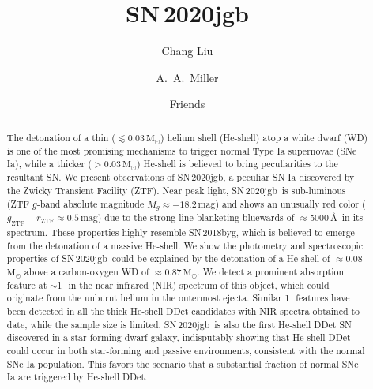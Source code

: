 \documentclass[twocolumn]{aastex631}
\newcommand{\sn}{SN\,2020jgb}
\begin{document}
\title{\sn}

\author[0000-0002-7866-4531]{Chang Liu}

\author[0000-0001-9515-478X]{A.~A.~Miller}

\author{Friends}

\begin{abstract}
    The detonation of a thin ($\lesssim$0.03\,$\mathrm{M_\odot}$) helium shell (He-shell) atop a white dwarf (WD) is one of the most promising mechanisms to trigger normal Type Ia supernovae (SNe Ia), while a thicker ($>$0.03\,$\mathrm{M_\odot}$) He-shell is believed to bring peculiarities to the resultant SN. We present observations of \sn, a peculiar SN Ia discovered by the Zwicky Transient Facility (ZTF). Near peak light, \sn\ is sub-luminous (ZTF $g$-band absolute magnitude $M_g\approx -18.2$\,mag) and shows an unusually red color ($g_\mathrm{ZTF}-r_\mathrm{ZTF}\approx 0.5$\,mag) due to the strong line-blanketing bluewards of $\approx$5000\,\AA\ in its spectrum. These properties highly resemble SN\,2018byg, which is believed to emerge from the detonation of a massive He-shell. We show the photometry and spectroscopic properties of \sn\ could be explained by the detonation of a He-shell of $\approx$0.08\,$\mathrm{M_\odot}$ above a carbon-oxygen WD of $\approx$0.87\,$\mathrm{M_\odot}$. We detect a prominent absorption feature at $\sim$1\,\micron\ in the near infrared (NIR) spectrum of this object, which could originate from the unburnt helium in the outermost ejecta. Similar 1\,\micron\ features have been detected in all the thick He-shell DDet candidates with NIR spectra obtained to date, while the sample size is limited. \sn\ is also the first He-shell DDet SN discovered in a star-forming dwarf galaxy, indisputably showing that He-shell DDet could occur in both star-forming and passive environments, consistent with the normal SNe Ia population. This favors the scenario that a substantial fraction of normal SNe Ia are triggered by He-shell DDet.
\end{abstract}

\end{document}
